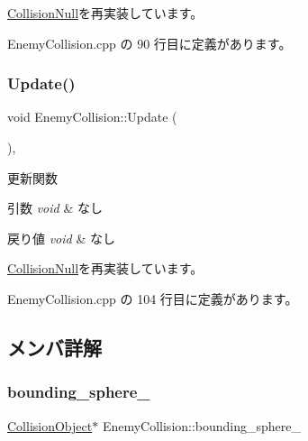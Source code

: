 \mbox{\hyperlink{class_collision_null_aafac3fdab43845465fd1e0198c423ccf}{Collision\+Null}}を再実装しています。



 Enemy\+Collision.\+cpp の 90 行目に定義があります。

\mbox{\label{class_enemy_collision_ab54133504d867c6d2070d2f3854a0aaf}} 
\subsubsection{\texorpdfstring{Update()}{Update()}}
{\footnotesize\ttfamily void Enemy\+Collision\+::\+Update (\begin{DoxyParamCaption}{ }\end{DoxyParamCaption})\hspace{0.3cm}{\ttfamily [override]}, {\ttfamily [virtual]}}



更新関数 


\begin{DoxyParams}{引数}
{\em void} & なし \\
\hline
\end{DoxyParams}

\begin{DoxyRetVals}{戻り値}
{\em void} & なし \\
\hline
\end{DoxyRetVals}


\mbox{\hyperlink{class_collision_null_ad6ac0e9b06fcb4e3d19a5c3c1cadfe7e}{Collision\+Null}}を再実装しています。



 Enemy\+Collision.\+cpp の 104 行目に定義があります。



\subsection{メンバ詳解}
\mbox{\label{class_enemy_collision_a065309bed90f1b2e3539cb9859bc06ef}} 
\subsubsection{\texorpdfstring{bounding\+\_\+sphere\+\_\+}{bounding\_sphere\_}}
{\footnotesize\ttfamily \mbox{\hyperlink{class_collision_object}{Collision\+Object}}$\ast$ Enemy\+Collision\+::bounding\+\_\+sphere\+\_\+\hspace{0.3cm}{\ttfamily [private]}}



